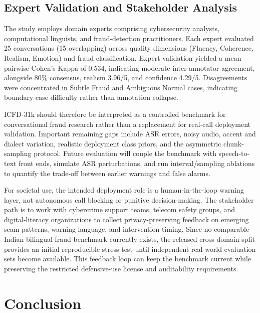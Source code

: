 \documentclass{article}
\newcommand{\crchange}[1]{{\color{blue}#1}}
\begin{document}
\subsection{Expert Validation and Stakeholder Analysis}
\crchange{The study employs domain experts comprising cybersecurity analysts, computational linguists, and fraud-detection practitioners. Each expert evaluated 25 conversations (15 overlapping) across quality dimensions (Fluency, Coherence, Realism, Emotion) and fraud classification. Expert validation yielded a mean pairwise Cohen's Kappa of 0.534, indicating moderate inter-annotator agreement, alongside 80\% consensus, realism 3.96/5, and confidence 4.29/5. Disagreements were concentrated in Subtle Fraud and Ambiguous Normal cases, indicating boundary-case difficulty rather than annotation collapse.}

\crchange{ICFD-31k should therefore be interpreted as a controlled benchmark for conversational fraud research rather than a replacement for real-call deployment validation. Important remaining gaps include ASR errors, noisy audio, accent and dialect variation, realistic deployment class priors, and the asymmetric chunk-sampling protocol. Future evaluation will couple the benchmark with speech-to-text front ends, simulate ASR perturbations, and run interval/sampling ablations to quantify the trade-off between earlier warnings and false alarms.}

\crchange{For societal use, the intended deployment role is a human-in-the-loop warning layer, not autonomous call blocking or punitive decision-making. The stakeholder path is to work with cybercrime support teams, telecom safety groups, and digital-literacy organizations to collect privacy-preserving feedback on emerging scam patterns, warning language, and intervention timing. Since no comparable Indian bilingual fraud benchmark currently exists, the released cross-domain split provides an initial reproducible stress test until independent real-world evaluation sets become available. This feedback loop can keep the benchmark current while preserving the restricted defensive-use license and auditability requirements.}

\section{Conclusion}
\end{document}
